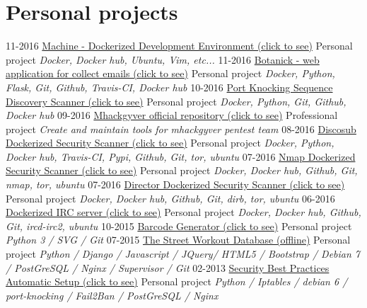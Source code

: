 \documentclass[]{friggeri-cv}
\begin{document}
\newpage

\section{Personal projects}
\begin{entrylist}
  \entry
    {11-2016}
    {\href{https://github.com/4383/machine}{Machine - Dockerized Development Environment (click to see)}}
    {Personal project}
    {\emph{Docker, Docker hub, Ubuntu, Vim, etc...}}
  \entry
    {11-2016}
    {\href{https://github.com/4383/Botanick}{Botanick - web application for collect emails (click to see)}}
    {Personal project}
    {\emph{Docker, Python, Flask, Git, Github, Travis-CI, Docker hub}}
  \entry
    {10-2016}
    {\href{https://github.com/mhackgyver-squad/porno-king}{Port Knocking Sequence Discovery Scanner (click to see)}}
    {Personal project}
    {\emph{Docker, Python, Git, Github, Docker hub}}
  \entry
    {09-2016}
    {\href{https://github.com/mhackgyver-squad/mhackgyver}{Mhackgyver official repository (click to see)}}
    {Professional project}
    {\emph{Create and maintain tools for mhackgyver pentest team}}
  \entry
    {08-2016}
    {\href{https://hub.docker.com/r/4383/discosub}{Discosub Dockerized Security Scanner (click to see)}}
    {Personal project}
    {\emph{Docker, Python, Docker hub, Travis-CI, Pypi, Github, Git, tor, ubuntu}}
  \entry
    {07-2016}
    {\href{https://hub.docker.com/r/4383/system-service-footprint}{Nmap Dockerized Security Scanner (click to see)}}
    {Personal project}
    {\emph{Docker, Docker hub, Github, Git, nmap, tor, ubuntu}}
  \entry
    {07-2016}
    {\href{https://hub.docker.com/r/4383/director}{Director Dockerized Security Scanner (click to see)}}
    {Personal project}
    {\emph{Docker, Docker hub, Github, Git, dirb, tor, ubuntu}}
  \entry
    {06-2016}
    {\href{https://hub.docker.com/r/4383/irc-server}{Dockerized IRC server (click to see)}}
    {Personal project}
    {\emph{Docker, Docker hub, Github, Git, ircd-irc2, ubuntu}}
  \entry
    {10-2015}
    {\href{http://pypi.python.org/pypi/barcode-generator/0.1rc15}{Barcode Generator (click to see)}}
    {Personal project}
    {\emph{Python 3 / SVG / Git}}
  \entry
    {07-2015}
    {\href{https://github.com/4383/street-workout-database}{The Street Workout Database (offline)}}
    {Personal project}
    {\emph{Python / Django / Javascript / JQuery/ HTML5 / Bootstrap / Debian 7 / PostGreSQL / Nginx / Supervisor / Git}}
  \entry
    {02-2013}
    {\href{https://github.com/4383/fabric-debian/}{Security Best Practices Automatic Setup (click to see)}}
    {Personal project}
    {\emph{Python / Iptables /  debian 6 / port-knocking / Fail2Ban / PostGreSQL / Nginx}}
\end{entrylist}
\end{document}
